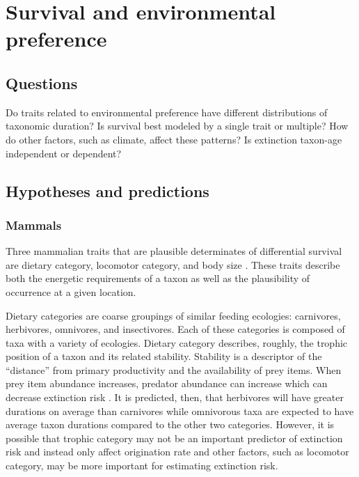 \documentclass[12pt,letterpaper]{article}
\begin{document}
\section{Survival and environmental preference}
\subsection{Questions}
Do traits related to environmental preference have different distributions of taxonomic duration? Is survival best modeled by a single trait or multiple? How do other factors, such as climate, affect these patterns? Is extinction taxon-age independent or dependent?

\subsection{Hypotheses and predictions}
\subsubsection{Mammals}
Three mammalian traits that are plausible determinates of differential survival are dietary category, locomotor category, and body size \citep{Price2012,Smith2004,Jernvall2004,Janis1993a,Blois2009,Liow2008,Alroy2000g,Johnson2002b}. These traits describe both the energetic requirements of a taxon as well as the plausibility of occurrence at a given location.

Dietary categories are coarse groupings of similar feeding ecologies: carnivores, herbivores, omnivores, and insectivores. Each of these categories is composed of taxa with a variety of ecologies. Dietary category describes, roughly, the trophic position of a taxon and its related stability. Stability is a descriptor of the ``distance'' from primary productivity and the availability of prey items. When prey item abundance increases, predator abundance can increase \citep{VanValen1989,Brown1987,Damuth1979,Silva1997,Janis2000} which can decrease extinction risk \citep{Jernvall2004,Brown1984,Jernvall2002,Fortelius2002}. It is predicted, then, that herbivores will have greater durations on average than carnivores while omnivorous taxa are expected to have average taxon durations compared to the other two categories. However, it is possible that trophic category may not be an important predictor of extinction risk and instead only affect origination rate \citep{Price2012} and other factors, such as locomotor category, may be more important for estimating extinction risk.
\end{document}
